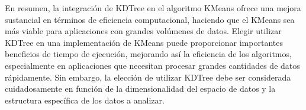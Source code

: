 \documentclass[conference]{IEEEtran}
\begin{document}
En resumen, la integración de KDTree en el algoritmo KMeans ofrece una mejora sustancial en términos de eficiencia computacional, haciendo que el KMeans sea más viable para aplicaciones con grandes volúmenes de datos. Elegir utilizar KDTree en una implementación de KMeans puede proporcionar importantes beneficios de tiempo de ejecución, mejorando así la eficiencia de los algoritmos, especialmente en aplicaciones que necesitan procesar grandes cantidades de datos rápidamente. Sin embargo, la elección de utilizar KDTree debe ser considerada cuidadosamente en función de la dimensionalidad del espacio de datos y la estructura específica de los datos a analizar.





\vspace{12pt}
\end{document}
